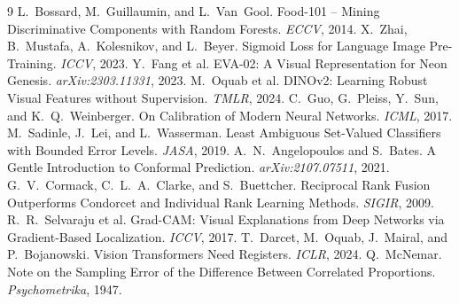 \documentclass[11pt,a4paper,twoside]{article}
\begin{document}
\begin{thebibliography}{9}
\small
{} L.~Bossard, M.~Guillaumin, and L.~Van~Gool.
  Food-101 -- Mining Discriminative Components with Random Forests. \emph{ECCV}, 2014.
 X.~Zhai, B.~Mustafa, A.~Kolesnikov, and L.~Beyer.
  Sigmoid Loss for Language Image Pre-Training. \emph{ICCV}, 2023.
 Y.~Fang et al.
  EVA-02: A Visual Representation for Neon Genesis. \emph{arXiv:2303.11331}, 2023.
 M.~Oquab et al.
  DINOv2: Learning Robust Visual Features without Supervision. \emph{TMLR}, 2024.
 C.~Guo, G.~Pleiss, Y.~Sun, and K.~Q.~Weinberger.
  On Calibration of Modern Neural Networks. \emph{ICML}, 2017.
 M.~Sadinle, J.~Lei, and L.~Wasserman.
  Least Ambiguous Set-Valued Classifiers with Bounded Error Levels. \emph{JASA}, 2019.
 A.~N.~Angelopoulos and S.~Bates.
  A Gentle Introduction to Conformal Prediction. \emph{arXiv:2107.07511}, 2021.
 G.~V.~Cormack, C.~L.~A.~Clarke, and S.~Buettcher.
  Reciprocal Rank Fusion Outperforms Condorcet and Individual Rank Learning Methods.
  \emph{SIGIR}, 2009.
 R.~R.~Selvaraju et al.
  Grad-CAM: Visual Explanations from Deep Networks via Gradient-Based Localization.
  \emph{ICCV}, 2017.
 T.~Darcet, M.~Oquab, J.~Mairal, and P.~Bojanowski.
  Vision Transformers Need Registers. \emph{ICLR}, 2024.
 Q.~McNemar.
  Note on the Sampling Error of the Difference Between Correlated Proportions.
  \emph{Psychometrika}, 1947.
\end{thebibliography}
\end{document}

